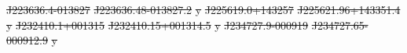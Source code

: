 \documentclass[11pt, a4paper]{book}
\providecommand{\DIFdeltex}[1]{{\protect\color{red}\sout{#1}}}                      %
\providecommand{\DIFdelFL}[1]{\DIFdel{#1}} %
\providecommand{\DIFdel}[1]{\texorpdfstring{\DIFdeltex{#1}}{}} %
\begin{document}
\DIFdelFL{J223636.4-013827 }%
\DIFdelFL{J223636.48-013827.2 }%
\DIFdelFL{y}%
\DIFdelFL{J225619.0+143257 }%
\DIFdelFL{J225621.96+143351.4 }%
\DIFdelFL{y}%
\DIFdelFL{J232410.1+001315 }%
\DIFdelFL{J232410.15+001314.5 }%
\DIFdelFL{y}%
\DIFdelFL{J234727.9-000919 }%
\DIFdelFL{J234727.65-000912.9 }%
\DIFdelFL{y}%

\end{document}
